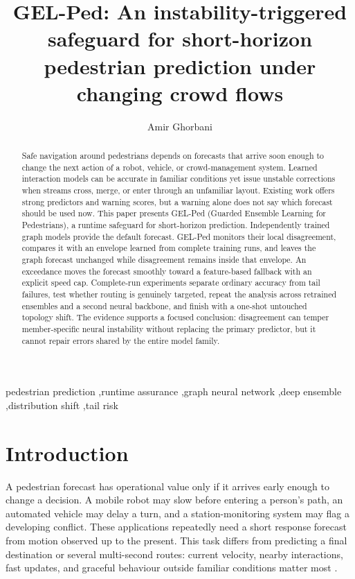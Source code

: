 \documentclass[preprint,11pt,authoryear]{elsarticle}
\begin{document}
\begin{frontmatter}
\title{GEL-Ped: An instability-triggered safeguard for short-horizon pedestrian prediction under changing crowd flows}
\author[melb]{Amir Ghorbani}
\begin{abstract}
Safe navigation around pedestrians depends on forecasts that arrive soon enough to change the next action of a robot, vehicle, or crowd-management system. Learned interaction models can be accurate in familiar conditions yet issue unstable corrections when streams cross, merge, or enter through an unfamiliar layout. Existing work offers strong predictors and warning scores, but a warning alone does not say which forecast should be used now. This paper presents GEL-Ped (Guarded Ensemble Learning for Pedestrians), a runtime safeguard for short-horizon prediction. Independently trained graph models provide the default forecast. GEL-Ped monitors their local disagreement, compares it with an envelope learned from complete training runs, and leaves the graph forecast unchanged while disagreement remains inside that envelope. An exceedance moves the forecast smoothly toward a feature-based fallback with an explicit speed cap. Complete-run experiments separate ordinary accuracy from tail failures, test whether routing is genuinely targeted, repeat the analysis across retrained ensembles and a second neural backbone, and finish with a one-shot untouched topology shift. The evidence supports a focused conclusion: disagreement can temper member-specific neural instability without replacing the primary predictor, but it cannot repair errors shared by the entire model family.
\end{abstract}
\begin{keyword}
pedestrian prediction \sep runtime assurance \sep graph neural network \sep deep ensemble \sep distribution shift \sep tail risk
\end{keyword}
\end{frontmatter}
\linenumbers

\section{Introduction}
\label{sec:introduction}
A pedestrian forecast has operational value only if it arrives early enough to change a decision. A mobile robot may slow before entering a person's path, an automated vehicle may delay a turn, and a station-monitoring system may flag a developing conflict. These applications repeatedly need a short response forecast from motion observed up to the present. This task differs from predicting a final destination or several multi-second routes: current velocity, nearby interactions, fast updates, and graceful behaviour outside familiar conditions matter most \citep{rudenko2020survey,kothari2022}.
\end{document}
